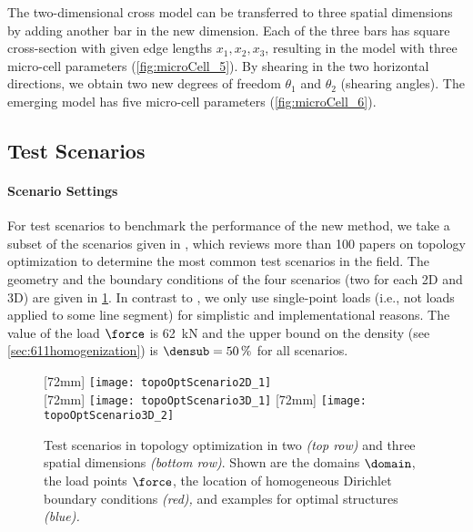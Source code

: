 The two-dimensional cross model can be transferred to three
spatial dimensions by adding another bar in the new dimension.
Each of the three bars has square cross-section with given edge lengths
$x_1, x_2, x_3$,
resulting in the  model with three micro-cell parameters
(\cref{fig:microCell_5}).
By shearing in the two horizontal directions,
we obtain two new degrees of freedom $\theta_1$ and $\theta_2$
(shearing angles).
The emerging  model has five micro-cell parameters
(\cref{fig:microCell_6}).



\subsection{Test Scenarios}
\label{sec:632scenarios}

\paragraph{Scenario Settings}

For test scenarios to benchmark the performance of the new method,
we take a subset of the scenarios given in \cite{Valdez17Topology},
which reviews more than 100 papers on topology optimization
to determine the most common test scenarios in the field.
The geometry and the boundary conditions of the
four scenarios (two for each 2D and 3D)
are given in \cref{fig:topoOptScenario}.
In contrast to \cite{Valdez17Topology},
we only use single-point loads
(i.e., not loads applied to some line segment)
for simplistic and implementational reasons.
The value of the load $\force$ is \SI{62}{\kilo\newton} and
the upper bound on the density (see \cref{sec:611homogenization})
is $\densub = \SI{50}{\percent}$ for all scenarios.

\begin{figure}
  [72mm]{%
    \texttt{[image: topoOptScenario2D\_1]}%
  }%
  \hfill%
  \\[7mm]%
  [72mm]{%
    \texttt{[image: topoOptScenario3D\_1]}%
  }%
  \hfill%
  [72mm]{%
    \texttt{[image: topoOptScenario3D\_2]}%
  }%
  \caption[Test scenarios in topology optimization]{%
    Test scenarios in topology optimization in
    two \emph{(top row)} and three spatial dimensions \emph{(bottom row)}.
    Shown are
    the domains $\domain$,
    the load points $\force$,
    the location of homogeneous Dirichlet boundary conditions
    \emph{\textcolor{C1}{(red)},} and
    examples for optimal structures \emph{\textcolor{C0}{(blue)}.}%
  }%
  \label{fig:topoOptScenario}%
\end{figure}

